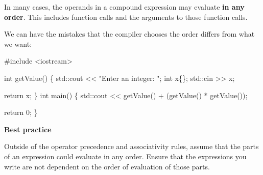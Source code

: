 \documentclass[
  letterpaper,
  DIV=11,
  numbers=noendperiod]{scrreprt}
\newenvironment{Shaded}{\begin{snugshade}}{\end{snugshade}}
\newcommand{\CommentTok}[1]{\textcolor[rgb]{0.37,0.37,0.37}{#1}}
\newcommand{\DecValTok}[1]{\textcolor[rgb]{0.68,0.00,0.00}{#1}}
\newcommand{\ErrorTok}[1]{\textcolor[rgb]{0.68,0.00,0.00}{#1}}
\newcommand{\FunctionTok}[1]{\textcolor[rgb]{0.28,0.35,0.67}{#1}}
\newcommand{\NormalTok}[1]{\textcolor[rgb]{0.00,0.23,0.31}{#1}}
\newcommand{\SpecialCharTok}[1]{\textcolor[rgb]{0.37,0.37,0.37}{#1}}
\newcommand{\StringTok}[1]{\textcolor[rgb]{0.13,0.47,0.30}{#1}}
\begin{document}
\begin{tcolorbox}[enhanced jigsaw, toprule=.15mm, rightrule=.15mm, opacityback=0, breakable, leftrule=.75mm, colback=white, colframe=quarto-callout-warning-color-frame, arc=.35mm, left=2mm, bottomrule=.15mm]
\begin{minipage}[t]{5.5mm}
\textcolor{quarto-callout-warning-color}{\faExclamationTriangle}
\end{minipage}%
\begin{minipage}[t]{\textwidth - 5.5mm}

In many cases, the operands in a compound expression may evaluate
\textbf{in any order}. This includes function calls and the arguments to
those function calls.

\end{minipage}%
\end{tcolorbox}

We can have the mistakes that the compiler chooses the order differs
from what we want:

\begin{Shaded}
\begin{Highlighting}[]
\CommentTok{\#include \textless{}iostream\textgreater{}}

\NormalTok{int }\FunctionTok{getValue}\NormalTok{()}
\NormalTok{\{}
\NormalTok{    std}\SpecialCharTok{::}\NormalTok{cout }\SpecialCharTok{\textless{}}\ErrorTok{\textless{}} \StringTok{"Enter an integer: "}\NormalTok{;}
\NormalTok{    int x\{\};}
\NormalTok{    std}\SpecialCharTok{::}\NormalTok{cin }\SpecialCharTok{\textgreater{}}\ErrorTok{\textgreater{}}\NormalTok{ x;}

\NormalTok{    return x;}
\NormalTok{\}}
\NormalTok{int }\FunctionTok{main}\NormalTok{()}
\NormalTok{\{}
\NormalTok{    std}\SpecialCharTok{::}\NormalTok{cout }\SpecialCharTok{\textless{}}\ErrorTok{\textless{}} \FunctionTok{getValue}\NormalTok{() }\SpecialCharTok{+}\NormalTok{ (}\FunctionTok{getValue}\NormalTok{() }\SpecialCharTok{*} \FunctionTok{getValue}\NormalTok{());}

\NormalTok{    return }\DecValTok{0}\NormalTok{;}
\NormalTok{\}}
\end{Highlighting}
\end{Shaded}

\begin{tcolorbox}[enhanced jigsaw, toprule=.15mm, rightrule=.15mm, opacityback=0, breakable, leftrule=.75mm, colback=white, colframe=quarto-callout-tip-color-frame, arc=.35mm, left=2mm, bottomrule=.15mm]
\begin{minipage}[t]{5.5mm}
\textcolor{quarto-callout-tip-color}{\faLightbulb}
\end{minipage}%
\begin{minipage}[t]{\textwidth - 5.5mm}

\textbf{Best practice}\vspace{2mm}

Outside of the operator precedence and associativity rules, assume that
the parts of an expression could evaluate in any order. Ensure that the
expressions you write are not dependent on the order of evaluation of
those parts.

\end{minipage}%
\end{tcolorbox}
\end{document}
